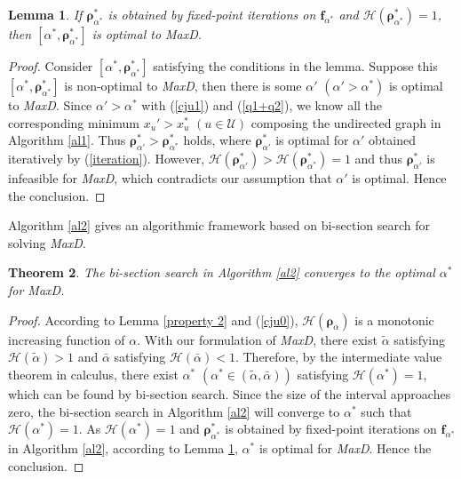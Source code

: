 \documentclass[10pt,journal,final,finalsubmission,twocolumn]{IEEEtran}
\newtheorem{theorem}{Theorem}
\newtheorem{lemma}[theorem]{Lemma}
\begin{document}
 \begin{lemma}\label{property 3}
If $\boldsymbol{\rho}^*_{\alpha^*}$ is obtained by fixed-point iterations on $\boldsymbol{f}_{\alpha^*}$ and $\mathcal{H}(\boldsymbol{\rho}^*_{\alpha^*}) = 1$, then $[\alpha^*, \boldsymbol{\rho}^*_{\alpha^*}]$ is optimal to MaxD.
\end{lemma}
\begin{proof}
Consider $[{\alpha^*}, \boldsymbol{\rho}^*_{\alpha^*}]$ satisfying the conditions in the lemma. Suppose this $[{\alpha^*}, \boldsymbol{\rho}^*_{\alpha^*}]$ is non-optimal to {\em MaxD}, then there is some $\alpha' $ $(\alpha' > \alpha^*)$ is optimal to {\em MaxD}. Since $\alpha' > \alpha^*$ with (\ref{cju1}) and (\ref{q1+q2}), we know all the corresponding minimum $x_u'> x_u^*$ $(u\in \mathcal{U})$ composing the undirected graph in Algorithm \ref{al1}. Thus $\boldsymbol{\rho}^*_{\alpha'} > \boldsymbol{\rho}^*_{\alpha^*}$ holds, where $\boldsymbol{\rho}^*_{\alpha'} $ is optimal for $\alpha'$ obtained iteratively by (\ref{iteration}). However, $\mathcal{H}(\boldsymbol{\rho}^*_{\alpha'}) >\mathcal{H}(\boldsymbol{\rho}^*_{\alpha^*}) = 1$ and thus $\boldsymbol{\rho}^*_{\alpha'}$ is infeasible for {\em MaxD}, which contradicts our assumption that $\alpha'$ is optimal. Hence the conclusion.
\end{proof}

Algorithm \ref{al2} gives an algorithmic framework based on bi-section search for solving {\em MaxD}. 

\begin{theorem}\label{canbisection}
The bi-section search in Algorithm \ref{al2} converges to the optimal $\alpha^*$ for MaxD.
\end{theorem}
\begin{proof}
According to Lemma \ref{property 2} and (\ref{cju0}), $\mathcal{H}({\boldsymbol{\rho}_{\alpha}})$ is a monotonic increasing function of $\alpha$. With our formulation of {\em MaxD}, there exist $\tilde{\alpha}$ satisfying $\mathcal{H}(\tilde{\alpha})>1$ and $\bar{\alpha}$ satisfying $\mathcal{H}(\bar{\alpha})<1$. Therefore, by the intermediate value theorem in calculus, there exist $\alpha^*$ $\left(\alpha^*\in\left(\tilde{\alpha},\bar{\alpha} \right)\right)$ satisfying $\mathcal{H}({\alpha^*})=1$, which can be found by bi-section search. Since the size of the interval approaches zero, the bi-section search in Algorithm \ref{al2} will converge to $\alpha^*$ such that $\mathcal{H}({\alpha^*})=1$. As $\mathcal{H}({\alpha^*})=1$ and $\boldsymbol{\rho}^*_{\alpha^*}$ is obtained by fixed-point iterations on $\boldsymbol{f}_{\alpha^*}$ in Algorithm \ref{al2}, according to Lemma \ref{property 3}, $\alpha^*$ is optimal for {\em MaxD}. Hence the conclusion.
\end{proof}
\end{document}
